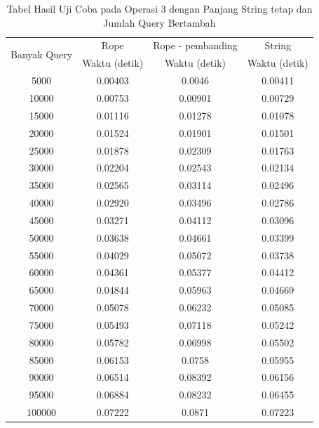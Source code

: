 \begin{appendices}
  \begin{table}[h]
    \centering
  	  \begin{tabular}{|c|c|c|c|}
   		  \hline
   		  \multirow{2}{*}{Banyak Query} & Rope & Rope - pembanding & String\\
   		    		  & Waktu (detik) & Waktu (detik) & Waktu (detik)\\ \hline
  		  5000	& 0.00403	& 0.0046	& 0.00411\\ \hline
  		  10000	& 0.00753	& 0.00901	& 0.00729\\ \hline
  		  15000	& 0.01116	& 0.01278	& 0.01078\\ \hline
  		  20000	& 0.01524	& 0.01901	& 0.01501\\ \hline
  		  25000	& 0.01878	& 0.02309	& 0.01763\\ \hline
  		  30000	& 0.02204	& 0.02543	& 0.02134\\ \hline
  		  35000	& 0.02565	& 0.03114	& 0.02496\\ \hline
  		  40000	& 0.02920	& 0.03496	& 0.02786\\ \hline
  		  45000	& 0.03271	& 0.04112	& 0.03096\\ \hline
  		  50000	& 0.03638	& 0.04661	& 0.03399\\ \hline
  		  55000	& 0.04029	& 0.05072	& 0.03738\\ \hline
  		  60000	& 0.04361	& 0.05377	& 0.04412\\ \hline
  		  65000	& 0.04844	& 0.05963	& 0.04669\\ \hline
  		  70000	& 0.05078	& 0.06232	& 0.05085\\ \hline
  		  75000	& 0.05493	& 0.07118	& 0.05242\\ \hline
  		  80000	& 0.05782	& 0.06998	& 0.05502\\ \hline
  		  85000	& 0.06153	& 0.0758	& 0.05955\\ \hline
  		  90000	& 0.06514	& 0.08392	& 0.06156\\ \hline
  		  95000	& 0.06884	& 0.08232	& 0.06455\\ \hline
  		  100000	& 0.07222	& 0.0871	& 0.07223\\ \hline
  	  \end{tabular}\caption{Tabel Hasil Uji Coba pada Operasi 3 dengan Panjang String tetap dan Jumlah Query Bertambah}
  	  \label{tab:operasi3query}
    \end{table}

\end{appendices}